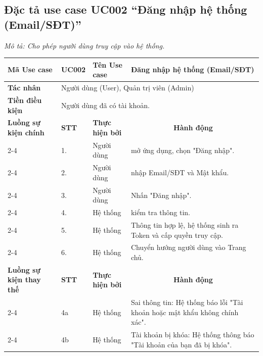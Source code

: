 \documentclass[../main.tex]{subfiles}
\begin{document}
\subsection{Đặc tả use case UC002 ``Đăng nhập hệ thống (Email/SĐT)''}
\textit{Mô tả: Cho phép người dùng truy cập vào hệ thống.}
\vspace{0.5cm}

\begingroup
\renewcommand{\arraystretch}{1.5}

\begin{longtable}{|p{2.7cm}|p{0.8cm}|p{2.6cm}|p{7.3cm}|}
\hline
\cellcolor[HTML]{D5F5E3}\textbf{Mã Use case} & \multicolumn{1}{l|}{UC002} & \cellcolor[HTML]{D5F5E3}\textbf{Tên Use case} & Đăng nhập hệ thống (Email/SĐT) \\ \hline
\cellcolor[HTML]{D5F5E3}\textbf{Tác nhân} & \multicolumn{3}{p{10.7cm}|}{Người dùng (User), Quản trị viên (Admin)} \\ \hline
\cellcolor[HTML]{D5F5E3}\textbf{Tiền điều kiện} & \multicolumn{3}{p{10.7cm}|}{Người dùng đã có tài khoản.} \\ \hline

\cellcolor[HTML]{D5F5E3}\textbf{Luồng sự kiện chính} & \cellcolor[HTML]{FDEBD0}\textbf{STT} & \cellcolor[HTML]{FDEBD0}\textbf{Thực hiện bởi} & \multicolumn{1}{c|}{\cellcolor[HTML]{FDEBD0}\textbf{Hành động}} \\ \cline{2-4} 
\cellcolor[HTML]{D5F5E3} & 1. & Người dùng & mở ứng dụng, chọn "Đăng nhập". \\ \cline{2-4} 
\cellcolor[HTML]{D5F5E3} & 2. & Người dùng & nhập Email/SĐT và Mật khẩu. \\ \cline{2-4} 
\cellcolor[HTML]{D5F5E3} & 3. & Người dùng & Nhấn "Đăng nhập". \\ \cline{2-4} 
\cellcolor[HTML]{D5F5E3} & 4. & Hệ thống & kiểm tra thông tin. \\ \cline{2-4} 
\cellcolor[HTML]{D5F5E3} & 5. & Hệ thống & Thông tin hợp lệ, hệ thống sinh ra Token và cấp quyền truy cập. \\ \cline{2-4} 
\cellcolor[HTML]{D5F5E3} & 6. & Hệ thống & Chuyển hướng người dùng vào Trang chủ. \\ \hline

\cellcolor[HTML]{D5F5E3}\textbf{Luồng sự kiện thay thế} & \cellcolor[HTML]{FDEBD0}\textbf{STT} & \cellcolor[HTML]{FDEBD0}\textbf{Thực hiện bởi} & \multicolumn{1}{c|}{\cellcolor[HTML]{FDEBD0}\textbf{Hành động}} \\ \cline{2-4} 
\cellcolor[HTML]{D5F5E3} & 4a & Hệ thống & Sai thông tin: Hệ thống báo lỗi "Tài khoản hoặc mật khẩu không chính xác". \\ \cline{2-4} 
\cellcolor[HTML]{D5F5E3} & 4b & Hệ thống & Tài khoản bị khóa: Hệ thống thông báo "Tài khoản của bạn đã bị khóa". \\ \hline


\end{longtable}
\end{document}
